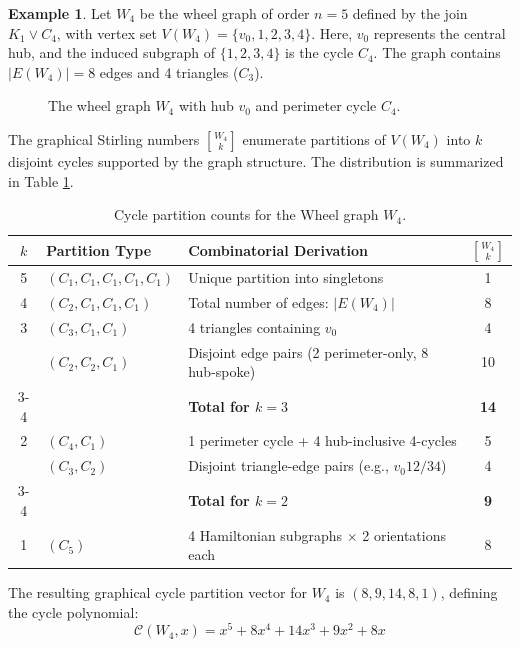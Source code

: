 \documentclass{amsart}
\theoremstyle{definition}
\newtheorem{example}[theorem]{Example}
\begin{document}
\begin{example}
Let $W_4$ be the wheel graph of order $n=5$ defined by the join $K_1 \vee C_4$, with vertex set $V(W_4) = \{v_0, 1, 2, 3, 4\}$. Here, $v_0$ represents the central hub, and the induced subgraph of $\{1, 2, 3, 4\}$ is the cycle $C_4$. The graph contains $|E(W_4)| = 8$ edges and 4 triangles ($C_3$).

\begin{figure}[h]
    \centering
    \caption{The wheel graph $W_4$ with hub $v_0$ and perimeter cycle $C_4$.}
    \label{fig:wheel4}
\end{figure}

The graphical Stirling numbers ${W_4 \brack k}$ enumerate partitions of $V(W_4)$ into $k$ disjoint cycles supported by the graph structure. The distribution is summarized in Table \ref{tab:wheel_counts}.

\begin{table}[h]\label{W4}
\centering
\caption{Cycle partition counts for the Wheel graph $W_4$.}
\label{tab:wheel_counts}
\begin{tabular}{|c|l|l|c|}
\hline
\textbf{$k$} & \textbf{Partition Type} & \textbf{Combinatorial Derivation} & \textbf{${W_4 \brack k}$} \\ \hline
5 & $(C_1, C_1, C_1, C_1, C_1)$ & Unique partition into singletons & 1 \\ \hline
4 & $(C_2, C_1, C_1, C_1)$ & Total number of edges: $|E(W_4)|$ & 8 \\ \hline
3 & $(C_3, C_1, C_1)$ & 4 triangles containing $v_0$ & 4 \\
  & $(C_2, C_2, C_1)$ & Disjoint edge pairs (2 perimeter-only, 8 hub-spoke) & 10 \\ \cline{3-4} 
  & & \textbf{Total for $k=3$} & \textbf{14} \\ \hline
2 & $(C_4, C_1)$ & 1 perimeter cycle + 4 hub-inclusive 4-cycles & 5 \\
  & $(C_3, C_2)$ & Disjoint triangle-edge pairs (e.g., $v_0 1 2 / 3 4$) & 4 \\ \cline{3-4} 
  & & \textbf{Total for $k=2$} & \textbf{9} \\ \hline
1 & $(C_5)$ & 4 Hamiltonian subgraphs $\times$ 2 orientations each & 8 \\ \hline
\end{tabular}
\end{table}

The resulting graphical cycle partition vector for $W_4$ is $(8, 9, 14, 8, 1)$, defining the cycle polynomial:
\begin{equation*}
\mathcal{C}(W_4, x) = x^5 + 8x^4 + 14x^3 + 9x^2 + 8x
\end{equation*}
\end{example}
\end{document}
